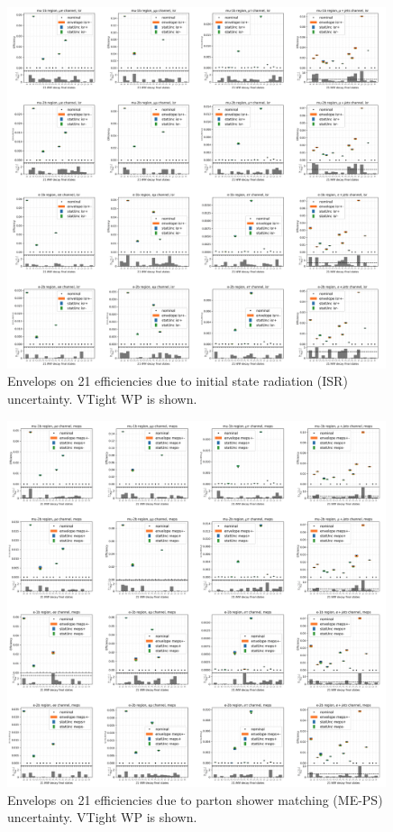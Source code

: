 \begin{figure}
    \centering
    \includegraphics[width=0.99\textwidth]{chapters/Analysis/sectionSystematics/figures/ttTheoretical/isr.png}
    \caption{Envelops on 21 efficiencies due to initial state radiation (ISR) uncertainty. VTight WP is shown.}
    \label{fig:analysis:systematics:effAfterCorrISR}
\end{figure}


\begin{figure}
    \centering
    \includegraphics[width=0.99\textwidth]{chapters/Analysis/sectionSystematics/figures/ttTheoretical/meps.png}
    \caption{Envelops on 21 efficiencies due to parton shower matching (ME-PS) uncertainty. VTight WP is shown.}
    \label{fig:analysis:systematics:effAfterCorrMEPS}
\end{figure}


